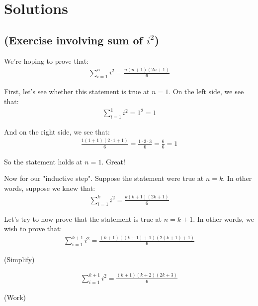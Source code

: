 \documentclass{book}
\begin{document}


\section{Solutions}

\subsection{(Exercise involving sum of $i^2$)}


We're hoping to prove that:
\begin{align*}
\sum_{i=1}^{n} i^2 = \frac{n(n+1)(2n+1)}{6}
\end{align*}

First, let's see whether this statement is true at $n = 1$. On the left side, we see that:
\begin{align*}
\sum_{i=1}^{1} i^2 = 1^2 = 1
\end{align*}

And on the right side, we see that:
\begin{align*}
\frac{1(1+1)(2 \cdot 1+1)}{6} = \frac{1 \cdot 2 \cdot 3}{6} = \frac{6}{6} = 1
\end{align*}

So the statement holds at $n = 1$. Great!


Now for our "inductive step". Suppose the statement were true at $n = k$. In other words, suppose we knew that:
\begin{align*}
\sum_{i=1}^{k} i^2 = \frac{k(k+1)(2k+1)}{6}
\end{align*}

Let's try to now prove that the statement is true at $n = k + 1$. In other words, we wish to prove that:
\begin{align*}
\sum_{i=1}^{k+1} i^2 = \frac{(k+1)((k+1)+1)(2(k+1)+1)}{6}
\end{align*}

(Simplify)

\begin{align*}
\sum_{i=1}^{k+1} i^2 = \frac{(k+1)(k+2)(2k+3)}{6}
\end{align*}

(Work)
\end{document}
